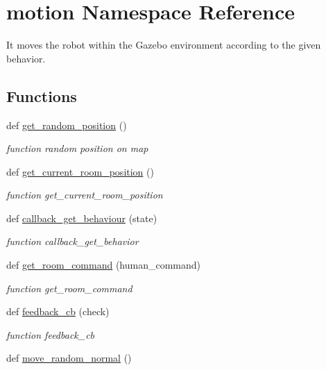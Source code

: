 \hypertarget{namespacemotion}{}\section{motion Namespace Reference}
\label{namespacemotion}


It moves the robot within the Gazebo environment according to the given behavior.  


\subsection*{Functions}
\begin{DoxyCompactItemize}
\item 
def \hyperlink{namespacemotion_af838e21dbf42903e9919b1b9263e306c}{get\+\_\+random\+\_\+position} ()
\begin{DoxyCompactList}\small\item\em function random position on map \end{DoxyCompactList}\item 
def \hyperlink{namespacemotion_aa4861fa33d9ce9a5edf2e9c5d0393ec1}{get\+\_\+current\+\_\+room\+\_\+position} ()
\begin{DoxyCompactList}\small\item\em function get\+\_\+current\+\_\+room\+\_\+position \end{DoxyCompactList}\item 
def \hyperlink{namespacemotion_a780223b6acd6bda378971227650c92e1}{callback\+\_\+get\+\_\+behaviour} (state)
\begin{DoxyCompactList}\small\item\em function callback\+\_\+get\+\_\+behavior \end{DoxyCompactList}\item 
def \hyperlink{namespacemotion_ae3d3508540404a8a6e74b2808768e95d}{get\+\_\+room\+\_\+command} (human\+\_\+command)
\begin{DoxyCompactList}\small\item\em function get\+\_\+room\+\_\+command \end{DoxyCompactList}\item 
def \hyperlink{namespacemotion_a4d516c2d2b3bec18bb4c6faf73e38fc8}{feedback\+\_\+cb} (check)
\begin{DoxyCompactList}\small\item\em function feedback\+\_\+cb \end{DoxyCompactList}\item 
def \hyperlink{namespacemotion_ad19c84db008ed0163c8122d570d026e2}{move\+\_\+random\+\_\+normal} ()

\end{DoxyCompactItemize}
